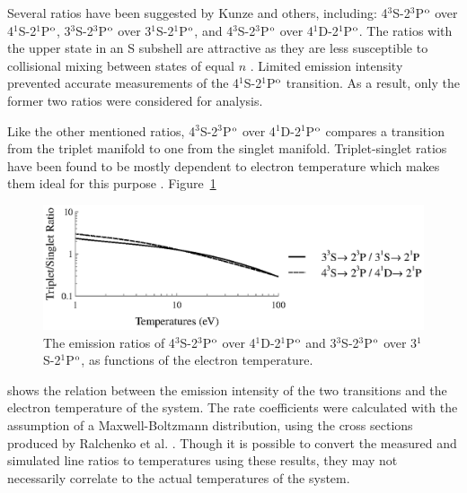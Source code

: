Several ratios have been suggested by Kunze and others, including:
4$^3$S-2$^3$P$^\mathrm{o}$ over 4$^1$S-2$^1$P$^\mathrm{o}$, 3$^3$S-2$^3$P$^\mathrm{o}$ over
3$^1$S-2$^1$P$^\mathrm{o}$, and 4$^3$S-2$^3$P$^\mathrm{o}$ over 4$^1$D-2$^1$P$^\mathrm{o}$. The
ratios with the upper state in an S subshell are attractive as they are less
susceptible to collisional mixing between states of equal $n$ \cite{Kunze2009}.
Limited emission intensity prevented accurate measurements of the
4$^1$S-2$^1$P$^\mathrm{o}$ transition. As a result, only the former two ratios were
considered for analysis.

Like the other mentioned ratios, 4$^3$S-2$^3$P$^\mathrm{o}$ over 4$^1$D-2$^1$P$^\mathrm{o}$
compares a transition from the triplet manifold to one from the singlet
manifold. Triplet-singlet ratios have been found to be mostly dependent to
electron temperature which makes them ideal for this purpose \cite{Griem2005}.
Figure~\ref{fig:conversion}
\begin{figure}
  \centering
  \includegraphics{./chapters/emissions/figures/conversion.eps}
  \caption{The emission ratios of 4$^3$S-2$^3$P$^\mathrm{o}$ over 4$^1$D-2$^1$P$^\mathrm{o}$ 
    and 3$^3$S-2$^3$P$^\mathrm{o}$ over 3$^1$S-2$^1$P$^\mathrm{o}$, as functions of the
    electron temperature.}
  \label{fig:conversion}
\end{figure}
shows the relation between the emission intensity of the two transitions and the
electron temperature of the system. The rate coefficients were calculated with
the assumption of a Maxwell-Boltzmann distribution, using the cross sections
produced by Ralchenko et al. \cite{Ralchenko2008}. Though it is possible to
convert the measured and simulated line ratios to temperatures using these
results, they may not necessarily correlate to the actual temperatures of the
system.

